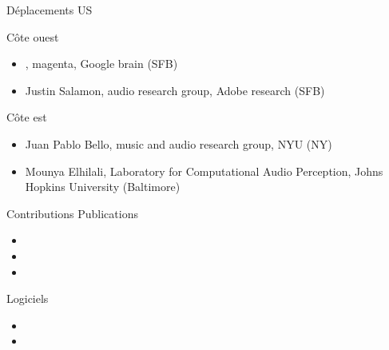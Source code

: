 \begin{frame}{Déplacements US}
\begin{block}{Côte ouest}
\begin{itemize}
\item {}, magenta, Google brain (SFB)
\item Justin Salamon, audio research group, Adobe research (SFB)
\end{itemize}
\end{block}
\begin{block}{Côte est}
\begin{itemize}
\item Juan Pablo Bello, music and audio research group, NYU (NY)
\item Mounya Elhilali, Laboratory for Computational Audio Perception, Johns Hopkins University (Baltimore)
\end{itemize}
\end{block}
\end{frame}

\begin{frame}{Contributions}
\small
Publications
\begin{itemize}
\item {}
\item {}
\item {}
\end{itemize}
Logiciels
\begin{itemize}
\item {}
\item {}
\end{itemize}
\end{frame}
